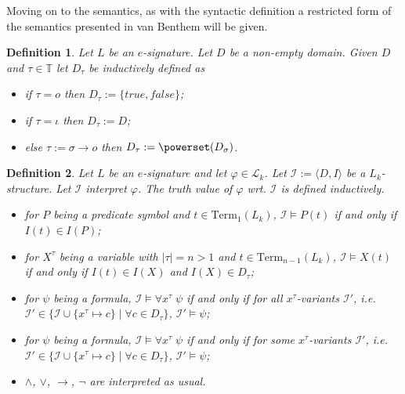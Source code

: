 \documentclass[11pt,a4paper]{article}
\newtheorem{mydef}{Definition}
\newcommand{\vanB}{van Benthem}
\begin{document}
Moving on to the semantics, as with the syntactic definition a restricted form of the semantics presented in \vanB  
will be given.

\begin{mydef}
Let $L$ be an $e$-signature. Let  $D$ be a non-empty domain. Given $D$ and $\tau \in \mathbb{T}$ let $D_{\tau}$ be inductively defined as
\begin{itemize}
\item if $\tau=o$ then $D_{\tau}:=\{\mathit{true}, \mathit{false}\}$;
\item if $\tau=\iota$ then $D_{\tau}:=D$;
\item else $\tau := \sigma\to o$ then $D_{\tau} := \powerset(D_{\sigma})$.
\end{itemize}
\end{mydef} 

%

\begin{mydef}
Let $L$ be an $e$-signature and let $\varphi \in \mathcal{L}_k$. Let $\mathcal{I}:=\langle D,I \rangle$ be a $L_k$-structure. Let $\mathcal{I}$ interpret $\varphi$. The truth value of $\varphi$ wrt. $\mathcal{I}$ is defined inductively.
\begin{itemize}
\item for $P$ being a predicate symbol and $t\in \mathrm{Term}_1(L_k)$, $\mathcal{I} \models P(t)$ if and only if $I(t) \in I(P)$;
\item for $X^{\tau}$ being a variable with $|\tau|=n>1$ and $t\in \mathrm{Term}_{n-1}(L_k)$, $\mathcal{I} \models X(t)$ if and only if $I(t) \in I(X)$ and $I(X) \in D_{\tau}$;
\item for $\psi$ being a formula, $\mathcal{I} \models \forall x^{\tau} \; \psi$  if and only if for all $x^{\tau}$-variants $\mathcal{I}'$, i.e.  $\mathcal{I}' \in \{ \mathcal{I} \cup \{x^{\tau} \mapsto c\} \mid \forall c \in D_{\tau} \}$, $\mathcal{I}' \models \psi$;
\item for $\psi$ being a formula, $\mathcal{I} \models \forall x^{\tau} \; \psi$  if and only if for some $x^{\tau}$-variants $\mathcal{I}'$, i.e.  $\mathcal{I}' \in \{ \mathcal{I} \cup \{x^{\tau}\mapsto c\} \mid \forall c \in D_{\tau} \}$, $\mathcal{I}' \models \psi$;
\item $\land$, $\lor$, $\to$, $\neg$ are interpreted as usual.
\end{itemize}
\end{mydef} 
\end{document}
